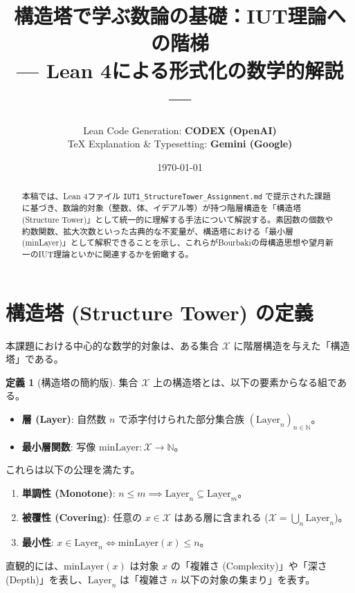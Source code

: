 \documentclass[a4paper,11pt]{ltjsarticle}
\title{\textbf{構造塔で学ぶ数論の基礎：IUT理論への階梯} \\ \large --- Lean 4による形式化の数学的解説 ---}
\author{
    Lean Code Generation: \textbf{CODEX (OpenAI)} \\
    TeX Explanation \& Typesetting: \textbf{Gemini (Google)}
}
\date{\today}
\theoremstyle{definition}
\newtheorem{definition}{定義}[section]
\newcommand{\N}{\mathbb{N}}
\newcommand{\Carrier}{\mathcal{X}}
\newcommand{\Layer}[1]{\mathrm{Layer}_{#1}}
\newcommand{\MinLayer}{\mathrm{minLayer}}
\begin{document}
\maketitle

\begin{abstract}
本稿では、Lean 4ファイル \texttt{IUT1\_StructureTower\_Assignment.md} で提示された課題に基づき、数論的対象（整数、体、イデアル等）が持つ階層構造を「構造塔 (Structure Tower)」として統一的に理解する手法について解説する。素因数の個数や約数関数、拡大次数といった古典的な不変量が、構造塔における「最小層 (minLayer)」として解釈できることを示し、これらがBourbakiの母構造思想や望月新一のIUT理論といかに関連するかを俯瞰する。
\end{abstract}

\tableofcontents
\newpage

\section{構造塔 (Structure Tower) の定義}

本課題における中心的な数学的対象は、ある集合 $\Carrier$ に階層構造を与えた「構造塔」である。

\begin{definition}[構造塔の簡約版]
集合 $\Carrier$ 上の構造塔とは、以下の要素からなる組である。
\begin{itemize}
    \item \textbf{層 (Layer)}: 自然数 $n$ で添字付けられた部分集合族 $(\Layer{n})_{n \in \N}$。
    \item \textbf{最小層関数}: 写像 $\MinLayer: \Carrier \to \N$。
\end{itemize}
これらは以下の公理を満たす。
\begin{enumerate}
    \item \textbf{単調性 (Monotone)}: $n \le m \implies \Layer{n} \subseteq \Layer{m}$。
    \item \textbf{被覆性 (Covering)}: 任意の $x \in \Carrier$ はある層に含まれる ($\Carrier = \bigcup_{n} \Layer{n}$)。
    \item \textbf{最小性}: $x \in \Layer{n} \iff \MinLayer(x) \le n$。
\end{enumerate}
\end{definition}

直観的には、$\MinLayer(x)$ は対象 $x$ の「複雑さ (Complexity)」や「深さ (Depth)」を表し、$\Layer{n}$ は「複雑さ $n$ 以下の対象の集まり」を表す。
\end{document}
